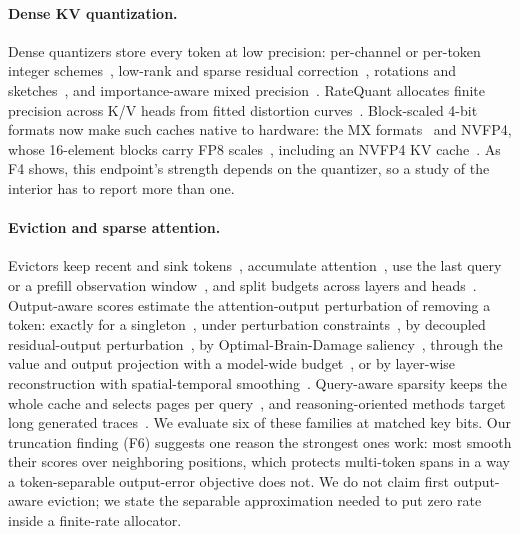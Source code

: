 \documentclass{article}
\theoremstyle{definition}
\begin{document}
\paragraph{Dense KV quantization.}
Dense quantizers store every token at low precision: per-channel or per-token integer schemes~\citep{liu2024kivi,hooper2024kvquant}, low-rank and sparse residual correction~\citep{kang2024gear}, rotations and sketches~\citep{zandieh2024qjl,zandieh2025turboquant}, and importance-aware mixed precision~\citep{yang2024mikv,he2024zipcache}.  RateQuant allocates finite precision across K/V heads from fitted distortion curves~\citep{zuo2026ratequant}.  Block-scaled 4-bit formats now make such caches native to hardware: the MX formats~\citep{ocp2023mx} and NVFP4, whose 16-element blocks carry FP8 scales~\citep{alvarez2025nvfp4}, including an NVFP4 KV cache~\citep{alvarez2025nvfp4kv}.  As F4 shows, this endpoint's strength depends on the quantizer, so a study of the interior has to report more than one.

\paragraph{Eviction and sparse attention.}
Evictors keep recent and sink tokens~\citep{xiao2024streamingllm}, accumulate attention~\citep{zhang2023h2o,liu2023scissorhands}, use the last query~\citep{oren2024tova} or a prefill observation window~\citep{li2024snapkv}, and split budgets across layers and heads~\citep{cai2024pyramidkv,feng2024adakv}.  
Output-aware scores estimate the attention-output perturbation of removing a token: exactly for a singleton~\citep{goel2025caote}, under perturbation constraints~\citep{feng2026criticalkv}, by decoupled residual-output perturbation~\citep{zhang2026dropkv}, by Optimal-Brain-Damage saliency~\citep{gu2026obcache}, through the value and output projection with a model-wide budget~\citep{mai2026laprox}, or by layer-wise reconstruction with spatial-temporal smoothing~\citep{an2026restkv}.  Query-aware sparsity keeps the whole cache and selects pages per query~\citep{tang2024quest}, and reasoning-oriented methods target long generated traces~\citep{cai2025rkv,mao2026triattention}.  We evaluate six of these families at matched key bits.  Our truncation finding (F6) suggests one reason the strongest ones work: most smooth their scores over neighboring positions, which protects multi-token spans in a way a token-separable output-error objective does not.  We do not claim first output-aware eviction; we state the separable approximation needed to put zero rate inside a finite-rate allocator.
\end{document}

